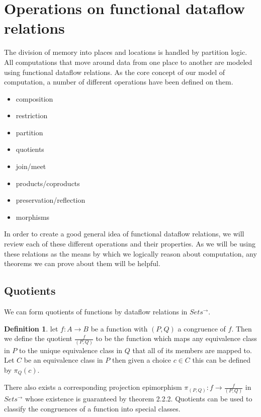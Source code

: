 \documentclass[a4paper,11pt, notitlepage]{report}
\theoremstyle{definition}
\newtheorem{definition}{Definition}[section]
\begin{document}
\newpage

\section{Operations on functional dataflow relations}
The division of memory into places and locations is handled by partition logic. All computations that move around data from one place to another are modeled using functional dataflow relations. As the core concept of our model of computation, a number of different operations have been defined on them.

\begin{itemize}
 \item composition
 \item restriction
 \item partition
 \item quotients
 \item join/meet
 \item products/coproducts
 \item preservation/reflection
 \item morphisms
\end{itemize}

In order to create a good general idea of functional dataflow relations, we will review each of these different operations and their properties. As we will be using these relations as the means by which we logically reason about computation, any theorems we can prove about them will be helpful.

\subsection{Quotients}
We can form quotients of functions by dataflow relations in $Sets^{\to}$.

\begin{definition}
let $f: A \to B$ be a function with $(P,Q)$ a congruence of $f$. Then we define the quotient $\frac{f}{(P,Q)}$ to be the function which maps any equivalence class in $P$ to the unique equivalence class in $Q$ that all of its members are mapped to. Let $C$ be an equivalence class in $P$ then given a choice $c \in C$ this can be defined by $\pi_Q(c)$.
\end{definition}

There also exists a corresponding projection epimorphism $\pi_{(P,Q)} : f \to \frac{f}{(P,Q)}$ in $Sets^{\to}$ whose existence is guaranteed by theorem 2.2.2. Quotients can be used to classify the congruences of a function into special classes.
\end{document}
